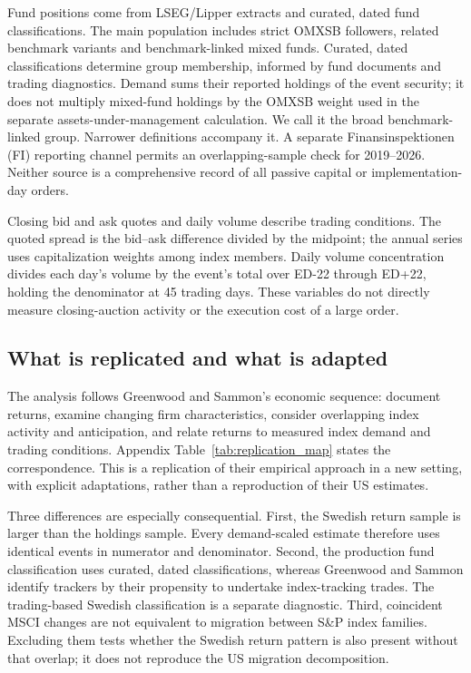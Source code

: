 Fund positions come from LSEG/Lipper extracts and curated, dated fund classifications. The main population includes strict OMXSB followers, related benchmark variants and benchmark-linked mixed funds. Curated, dated classifications determine group membership, informed by fund documents and trading diagnostics. Demand sums their reported holdings of the event security; it does not multiply mixed-fund holdings by the OMXSB weight used in the separate assets-under-management calculation. We call it the broad benchmark-linked group. Narrower definitions accompany it. A separate Finansinspektionen (FI) reporting channel permits an overlapping-sample check for 2019--2026. Neither source is a comprehensive record of all passive capital or implementation-day orders.

Closing bid and ask quotes and daily volume describe trading conditions. The quoted spread is the bid--ask difference divided by the midpoint; the annual series uses capitalization weights among index members. Daily volume concentration divides each day's volume by the event's total over ED-22 through ED+22, holding the denominator at 45 trading days. These variables do not directly measure closing-auction activity or the execution cost of a large order.

\subsection{What is replicated and what is adapted}

The analysis follows Greenwood and Sammon's economic sequence: document returns, examine changing firm characteristics, consider overlapping index activity and anticipation, and relate returns to measured index demand and trading conditions. Appendix Table~\ref{tab:replication_map} states the correspondence. This is a replication of their empirical approach in a new setting, with explicit adaptations, rather than a reproduction of their US estimates.

Three differences are especially consequential. First, the Swedish return sample is larger than the holdings sample. Every demand-scaled estimate therefore uses identical events in numerator and denominator. Second, the production fund classification uses curated, dated classifications, whereas Greenwood and Sammon identify trackers by their propensity to undertake index-tracking trades. The trading-based Swedish classification is a separate diagnostic. Third, coincident MSCI changes are not equivalent to migration between S\&P index families. Excluding them tests whether the Swedish return pattern is also present without that overlap; it does not reproduce the US migration decomposition.


